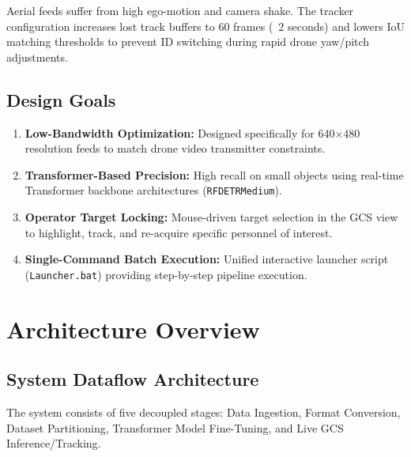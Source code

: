 \documentclass[11pt,a4paper]{article}
\begin{document}
\begin{warnbox}
    Aerial feeds suffer from high ego-motion and camera shake. The tracker configuration increases lost track buffers to 60 frames (~2 seconds) and lowers IoU matching thresholds to prevent ID switching during rapid drone yaw/pitch adjustments.
\end{warnbox}

\subsection{Design Goals}
\begin{enumerate}
    \item \textbf{Low-Bandwidth Optimization:} Designed specifically for 640$\times$480 resolution feeds to match drone video transmitter constraints.
    \item \textbf{Transformer-Based Precision:} High recall on small objects using real-time Transformer backbone architectures (\texttt{RFDETRMedium}).
    \item \textbf{Operator Target Locking:} Mouse-driven target selection in the GCS view to highlight, track, and re-acquire specific personnel of interest.
    \item \textbf{Single-Command Batch Execution:} Unified interactive launcher script (\texttt{Launcher.bat}) providing step-by-step pipeline execution.
\end{enumerate}

\newpage

\section{Architecture Overview}

\subsection{System Dataflow Architecture}
The system consists of five decoupled stages: Data Ingestion, Format Conversion, Dataset Partitioning, Transformer Model Fine-Tuning, and Live GCS Inference/Tracking.
\end{document}

